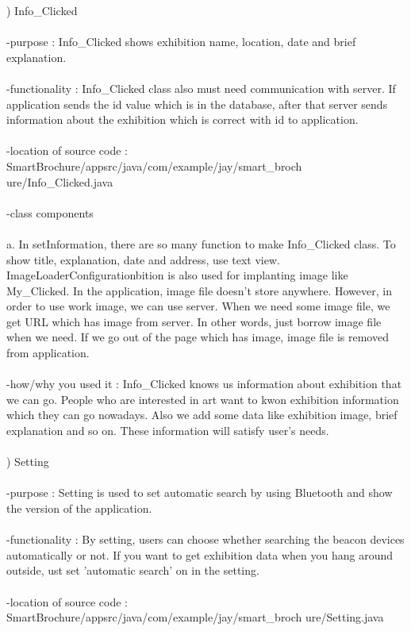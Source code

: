 \documentclass[conference]{IEEEtran}
\begin{document}
) Info\_Clicked\\\\
-purpose : Info\_Clicked shows exhibition name, location, date and brief explanation.\\
\\ -functionality : Info\_Clicked class also must need communication with server. If application sends the id value which is in the database, after that server sends information about the exhibition which is correct with id to application.\\
\\ -location of source code : SmartBrochure/appsrc/java/com/example/jay/smart\_broch
ure/Info\_Clicked.java\\
\\ -class components\\
\\ a. In setInformation, there are so many function to make Info\_Clicked class. To show title, explanation, date and address, use text view.  ImageLoaderConfigurationbition is also used for implanting image like My\_Clicked. In the application, image file doesn't store anywhere. However, in order to use work image, we can use server. When we need some image file, we get URL which has image from server. In other words, just borrow image file when we need. If we go out of the page which has image, image file is removed from application.\\
\\ -how/why you used it : Info\_Clicked knows us information about exhibition that we can go. People who are interested in art want to kwon exhibition information which they can go nowadays. Also we add some data like exhibition image, brief explanation and so on. These information will satisfy user's needs.\\\\
) Setting\\\\
-purpose : Setting is used to set automatic search by using Bluetooth and show the version of the application.\\
\\ -functionality : By setting, users can choose whether searching the beacon devices automatically or not. If you want to get exhibition data when you hang around outside, ust set 'automatic search' on in the setting.\\
\\ -location of source code : SmartBrochure/appsrc/java/com/example/jay/smart\_broch
ure/Setting.java\\
\end{document}
